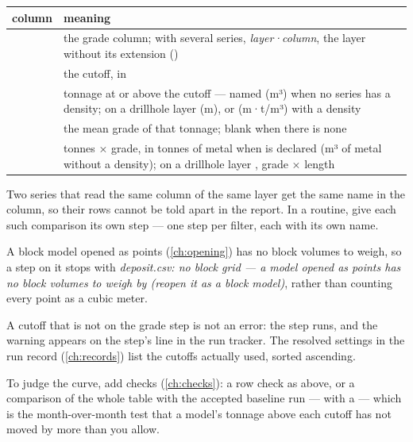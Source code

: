 \medskip
\begin{tabularx}{\linewidth}{@{}lL@{}}\toprule
column & meaning \\ \midrule
{} & the grade column; with several series, \emph{layer·column}, the layer without its extension () \\
 & the cutoff, in  \\
 & tonnage at or above the cutoff — named  (m³) when no series has a density; on a drillhole layer  (m), or  (m·t/m³) with a density \\
 & the mean grade of that tonnage; blank when there is none \\
 & tonnes × grade, in tonnes of metal when  is declared (m³ of metal without a density); on a drillhole layer , grade × length \\ \bottomrule
\end{tabularx}
\medskip

\begin{caution}
Two series that read the same column of the same layer get the same name in the  column, so their rows cannot be told apart in the report. In a routine, give each such comparison its own step — one  step per filter, each with its own  name.
\end{caution}

A block model opened as points (\cref{ch:opening}) has no block volumes to weigh, so a  step on it stops with \emph{deposit.csv: no block grid — a model opened as points has no block volumes to weigh by (reopen it as a block model)}, rather than counting every point as a cubic meter.

A cutoff that is not on the grade step is not an error: the step runs, and the warning appears on the step's line in the run tracker. The resolved settings in the run record (\cref{ch:records}) list the cutoffs actually used, sorted ascending.

To judge the curve, add checks (\cref{ch:checks}): a row check as above, or a comparison of the whole table with the accepted baseline run —  with a  — which is the month-over-month test that a model's tonnage above each cutoff has not moved by more than you allow.
